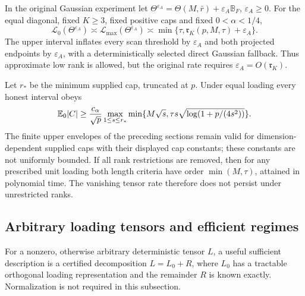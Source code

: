 \begin{theorem}\label{thm:approx_sharp}
In the original Gaussian experiment let
$\Theta^{\varepsilon_A}=\Theta(M,\bar r)+\varepsilon_A\mathbb B_F$, $\varepsilon_A\ge0$. For the equal diagonal, fixed $K\ge3$, fixed positive caps and fixed $0<\alpha<1/4$,
\[
 \mathcal L_0(\Theta^{\varepsilon_A})\asymp\mathcal L_{\max}(\Theta^{\varepsilon_A})
 \asymp \min\{\tau,\mathfrak r_K(p,M,\tau)+\varepsilon_A\}.
\]
The upper interval inflates every scan threshold by $\varepsilon_A$ and both projected endpoints by $\varepsilon_A$, with a deterministically selected direct Gaussian fallback. Thus approximate low rank is allowed, but the original rate requires $\varepsilon_A=O(\mathfrak r_K)$.
\end{theorem}

\begin{proposition}\label{prop:growing_caps}
Let $r_*$ be the minimum supplied cap, truncated at $p$. Under equal loading every honest interval obeys
\[
 \mathbb E_0|C|\ge\frac{c_\alpha}{\sqrt p}
 \max_{1\le s\le r_*}
 \min\{M\sqrt s,\tau s\sqrt{\log(1+p/(4s^2))}\}.
\]
The finite upper envelopes of the preceding sections remain valid for dimension-dependent supplied caps with their displayed cap constants; these constants are not uniformly bounded. If all rank restrictions are removed, then for any prescribed unit loading both length criteria have order $\min(M,\tau)$, attained in polynomial time. The vanishing tensor rate therefore does not persist under unrestricted ranks.
\end{proposition}

\subsection{Arbitrary loading tensors and efficient regimes}

For a nonzero, otherwise arbitrary deterministic tensor $L$, a useful sufficient description is a certified decomposition $L=L_0+R$, where $L_0$ has a tractable orthogonal loading representation and the remainder $R$ is known exactly. Normalization is not required in this subsection.

